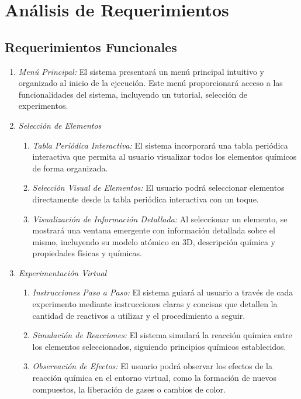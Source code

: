 \section{Análisis de Requerimientos}
\subsection{Requerimientos Funcionales}
\begin{enumerate}[RF1.]
    \item \textit{Menú Principal: }El sistema presentará un menú principal intuitivo y organizado al inicio de la ejecución. Este menú proporcionará acceso a las funcionalidades del sistema, incluyendo un tutorial, selección de experimentos.
    \item \textit{Selección de Elementos}
    \begin{enumerate}[{RF2.}1.]
        \item \textit{Tabla Periódica Interactiva: }El sistema incorporará una tabla periódica interactiva que permita al usuario visualizar todos los elementos químicos de forma organizada.
        \item \textit{Selección Visual de Elementos: }El usuario podrá seleccionar elementos directamente desde la tabla periódica interactiva con un toque. 
        \item \textit{Visualización de Información Detallada: }Al seleccionar un elemento, se mostrará una ventana emergente con información detallada sobre el mismo, incluyendo su modelo atómico en 3D, descripción química y propiedades físicas y químicas. 
    \end{enumerate}
    \item \textit{Experimentación Virtual}
    \begin{enumerate}[{RF3.}1.]
        \item \textit{Instrucciones Paso a Paso:} El sistema guiará al usuario a través de cada experimento mediante instrucciones claras y concisas que detallen la cantidad de reactivos a utilizar y el procedimiento a seguir.
        \item \textit{Simulación de Reacciones: }El sistema simulará la reacción química entre los elementos seleccionados, siguiendo principios químicos establecidos.
        \item \textit{Observación de Efectos:} El usuario podrá observar los efectos de la reacción química en el entorno virtual, como la formación de nuevos compuestos, la liberación de gases o cambios de color.
    \end{enumerate}
\end{enumerate}
